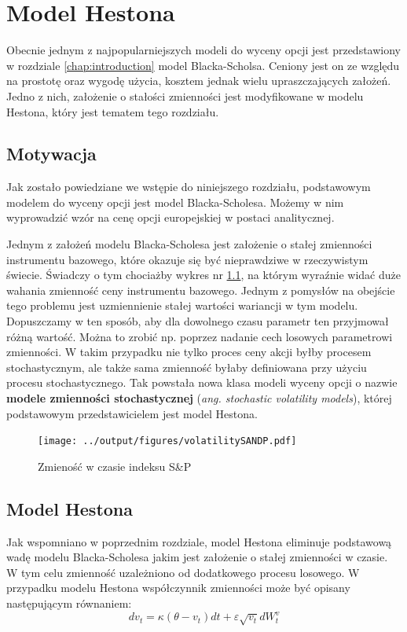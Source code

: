 \documentclass{pracamgr}
\begin{document}
\chapter{Model Hestona}
\label{chap:hestonModel}

Obecnie jednym z najpopularniejszych modeli do wyceny opcji jest przedstawiony 
w rozdziale \ref{chap:introduction} model Blacka-Scholsa. Ceniony jest 
on ze względu na prostotę oraz wygodę użycia, kosztem jednak wielu upraszczających założeń. 
Jedno z nich, założenie o stałości zmienności jest modyfikowane w modelu Hestona, który jest 
tematem tego rozdziału.


\section{Motywacja} 
Jak zostało powiedziane we wstępie do niniejszego rozdziału, podstawowym modelem do wyceny opcji jest 
model Blacka-Scholesa.
Możemy w nim wyprowadzić wzór na cenę opcji europejskiej w postaci analitycznej. 

Jednym z założeń modelu Blacka-Scholesa jest założenie o stałej zmienności instrumentu bazowego, 
które okazuje się być nieprawdziwe w rzeczywistym świecie. Świadczy o tym chociażby
wykres nr \ref{fig:vix}, na którym wyraźnie widać duże wahania zmienność ceny instrumentu bazowego.
Jednym z pomysłów na
obejście tego problemu jest uzmiennienie stałej wartości wariancji w tym modelu. Dopuszczamy w ten 
sposób, aby dla dowolnego czasu parametr ten przyjmował różną wartość. Można to zrobić np. poprzez 
nadanie cech losowych parametrowi zmienności. 
W takim przypadku nie tylko proces ceny akcji byłby procesem 
stochastycznym, ale także sama zmienność byłaby definiowana przy użyciu procesu stochastycznego. 
Tak powstała nowa klasa modeli wyceny opcji o nazwie \textbf{modele zmienności stochastycznej} 
(\textit{ang. stochastic volatility models}), której podstawowym 
przedstawicielem jest model Hestona.



\begin{figure}
  \centering  
  \texttt{[image: ../output/figures/volatilitySANDP.pdf]}
  \caption{Zmieność w czasie indeksu S\&P}\label{fig:vix}
\end{figure} 

\section{Model Hestona}
Jak wspomniano w poprzednim rozdziale, model Hestona eliminuje podstawową wadę modelu Blacka-Scholesa 
jakim jest założenie o stałej zmienności w czasie.
W tym celu zmienność uzależniono od dodatkowego procesu losowego. W 
przypadku modelu Hestona współczynnik zmienności może być opisany następującym równaniem:
\begin{equation}
\label{eq:cir}
dv_t  = \kappa (\theta  - v_t)dt + \varepsilon \sqrt{v_t} dW_t^v 
\end{equation}
\end{document}
